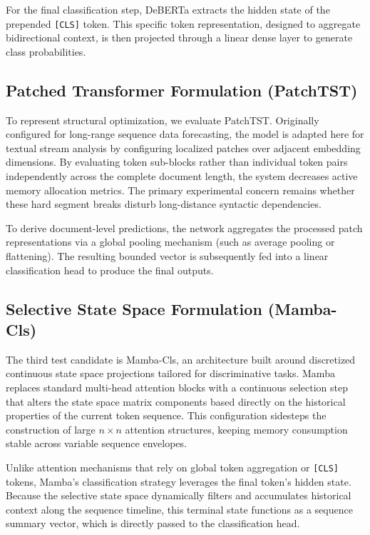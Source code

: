 \documentclass[runningheads]{llncs}
\begin{document}
For the final classification step, DeBERTa extracts the hidden state of the prepended \texttt{[CLS]} token. This specific token representation, designed to aggregate bidirectional context, is then projected through a linear dense layer to generate class probabilities.

\subsection{Patched Transformer Formulation (PatchTST)}
To represent structural optimization, we evaluate PatchTST. Originally configured for long-range sequence data forecasting, the model is adapted here for textual stream analysis by configuring localized patches over adjacent embedding dimensions. By evaluating token sub-blocks rather than individual token pairs independently across the complete document length, the system decreases active memory allocation metrics. The primary experimental concern remains whether these hard segment breaks disturb long-distance syntactic dependencies.

To derive document-level predictions, the network aggregates the processed patch representations via a global pooling mechanism (such as average pooling or flattening). The resulting bounded vector is subsequently fed into a linear classification head to produce the final outputs.

\subsection{Selective State Space Formulation (Mamba-Cls)}
The third test candidate is Mamba-Cls, an architecture built around discretized continuous state space projections tailored for discriminative tasks. Mamba replaces standard multi-head attention blocks with a continuous selection step that alters the state space matrix components based directly on the historical properties of the current token sequence. This configuration sidesteps the construction of large $n \times n$ attention structures, keeping memory consumption stable across variable sequence envelopes.

Unlike attention mechanisms that rely on global token aggregation or \texttt{[CLS]} tokens, Mamba's classification strategy leverages the final token's hidden state. Because the selective state space dynamically filters and accumulates historical context along the sequence timeline, this terminal state functions as a sequence summary vector, which is directly passed to the classification head.
\end{document}
